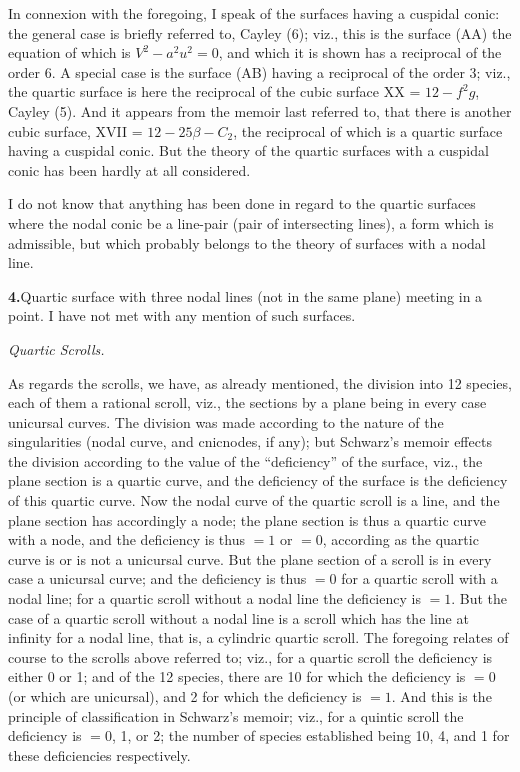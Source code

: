 \documentclass[11pt,a4paper]{article}
\begin{document}
In connexion with the foregoing, I speak of the surfaces having a cuspidal conic: the general case is briefly referred to, Cayley (6); viz., this is the surface (AA) the equation of which is $V^2 - a^2 u^2 = 0$, and which it is shown has a reciprocal of the order 6. A special case is the surface (AB) having a reciprocal of the order 3; viz., the quartic surface is here the reciprocal of the cubic surface XX = $12 - f^2 g$, Cayley (5). And it appears from the memoir last referred to, that there is another cubic surface, XVII = $12 - 25\beta - C_2$, the reciprocal of which is a quartic surface having a cuspidal conic. But the theory of the quartic surfaces with a cuspidal conic has been hardly at all considered.

I do not know that anything has been done in regard to the quartic surfaces where the nodal conic be a line-pair (pair of intersecting lines), a form which is admissible, but which probably belongs to the theory of surfaces with a nodal line.

\textbf{4.}\quad Quartic surface with three nodal lines (not in the same plane) meeting in a point. I have not met with any mention of such surfaces.

\vspace{0.5em}
\textit{Quartic Scrolls.}

As regards the scrolls, we have, as already mentioned, the division into 12 species, each of them a rational scroll, viz., the sections by a plane being in every case unicursal curves. The division was made according to the nature of the singularities (nodal curve, and cnicnodes, if any); but Schwarz's memoir effects the division according to the value of the ``deficiency'' of the surface, viz., the plane section is a quartic curve, and the deficiency of the surface is the deficiency of this quartic curve. Now the nodal curve of the quartic scroll is a line, and the plane section has accordingly a node; the plane section is thus a quartic curve with a node, and the deficiency is thus $= 1$ or $= 0$, according as the quartic curve is or is not a unicursal curve. But the plane section of a scroll is in every case a unicursal curve; and the deficiency is thus $= 0$ for a quartic scroll with a nodal line; for a quartic scroll without a nodal line the deficiency is $= 1$. But the case of a quartic scroll without a nodal line is a scroll which has the line at infinity for a nodal line, that is, a cylindric quartic scroll. The foregoing relates of course to the scrolls above referred to; viz., for a quartic scroll the deficiency is either 0 or 1; and of the 12 species, there are 10 for which the deficiency is $= 0$ (or which are unicursal), and 2 for which the deficiency is $= 1$. And this is the principle of classification in Schwarz's memoir; viz., for a quintic scroll the deficiency is $= 0$, 1, or 2; the number of species established being 10, 4, and 1 for these deficiencies respectively.
\end{document}
